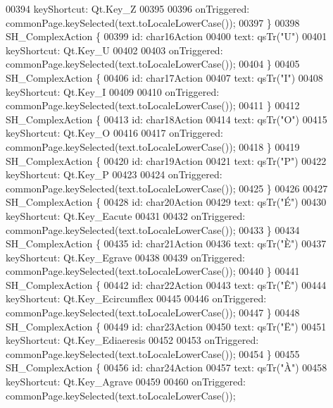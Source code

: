 \begin{DoxyCode}
00394         keyShortcut: Qt.Key\_Z
00395 
00396         onTriggered: commonPage.keySelected(text.toLocaleLowerCase());
00397     \}
00398     SH\_ComplexAction \{
00399         \textcolor{keywordtype}{id}: char16Action
00400         text: qsTr(\textcolor{stringliteral}{"U"})
00401         keyShortcut: Qt.Key\_U
00402 
00403         onTriggered: commonPage.keySelected(text.toLocaleLowerCase());
00404     \}
00405     SH\_ComplexAction \{
00406         \textcolor{keywordtype}{id}: char17Action
00407         text: qsTr(\textcolor{stringliteral}{"I"})
00408         keyShortcut: Qt.Key\_I
00409 
00410         onTriggered: commonPage.keySelected(text.toLocaleLowerCase());
00411     \}
00412     SH\_ComplexAction \{
00413         \textcolor{keywordtype}{id}: char18Action
00414         text: qsTr(\textcolor{stringliteral}{"O"})
00415         keyShortcut: Qt.Key\_O
00416 
00417         onTriggered: commonPage.keySelected(text.toLocaleLowerCase());
00418     \}
00419     SH\_ComplexAction \{
00420         \textcolor{keywordtype}{id}: char19Action
00421         text: qsTr(\textcolor{stringliteral}{"P"})
00422         keyShortcut: Qt.Key\_P
00423 
00424         onTriggered: commonPage.keySelected(text.toLocaleLowerCase());
00425     \}
00426 
00427     SH\_ComplexAction \{
00428         \textcolor{keywordtype}{id}: char20Action
00429         text: qsTr(\textcolor{stringliteral}{"É"})
00430         keyShortcut: Qt.Key\_Eacute
00431 
00432         onTriggered: commonPage.keySelected(text.toLocaleLowerCase());
00433     \}
00434     SH\_ComplexAction \{
00435         \textcolor{keywordtype}{id}: char21Action
00436         text: qsTr(\textcolor{stringliteral}{"È"})
00437         keyShortcut: Qt.Key\_Egrave
00438 
00439         onTriggered: commonPage.keySelected(text.toLocaleLowerCase());
00440     \}
00441     SH\_ComplexAction \{
00442         \textcolor{keywordtype}{id}: char22Action
00443         text: qsTr(\textcolor{stringliteral}{"Ê"})
00444         keyShortcut: Qt.Key\_Ecircumflex
00445 
00446         onTriggered: commonPage.keySelected(text.toLocaleLowerCase());
00447     \}
00448     SH\_ComplexAction \{
00449         \textcolor{keywordtype}{id}: char23Action
00450         text: qsTr(\textcolor{stringliteral}{"Ë"})
00451         keyShortcut: Qt.Key\_Ediaeresis
00452 
00453         onTriggered: commonPage.keySelected(text.toLocaleLowerCase());
00454     \}
00455     SH\_ComplexAction \{
00456         \textcolor{keywordtype}{id}: char24Action
00457         text: qsTr(\textcolor{stringliteral}{"À"})
00458         keyShortcut: Qt.Key\_Agrave
00459 
00460         onTriggered: commonPage.keySelected(text.toLocaleLowerCase());

\end{DoxyCode}
